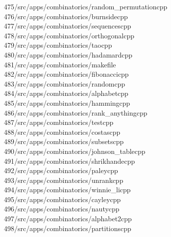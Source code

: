 \begin{tabbing}
475\>/src/apps/combinatorics/random\_permutationcpp\\[0pt]
476\>/src/apps/combinatorics/burnsidecpp\\[0pt]
477\>/src/apps/combinatorics/sequencescpp\\[0pt]
478\>/src/apps/combinatorics/orthogonalcpp\\[0pt]
479\>/src/apps/combinatorics/taocpp\\[0pt]
480\>/src/apps/combinatorics/hadamardcpp\\[0pt]
481\>/src/apps/combinatorics/makefile\\[0pt]
482\>/src/apps/combinatorics/fibonaccicpp\\[0pt]
483\>/src/apps/combinatorics/randomcpp\\[0pt]
484\>/src/apps/combinatorics/alphabetcpp\\[0pt]
485\>/src/apps/combinatorics/hammingcpp\\[0pt]
486\>/src/apps/combinatorics/rank\_anythingcpp\\[0pt]
487\>/src/apps/combinatorics/testcpp\\[0pt]
488\>/src/apps/combinatorics/costascpp\\[0pt]
489\>/src/apps/combinatorics/subsetscpp\\[0pt]
490\>/src/apps/combinatorics/johnson\_tablecpp\\[0pt]
491\>/src/apps/combinatorics/shrikhandecpp\\[0pt]
492\>/src/apps/combinatorics/paleycpp\\[0pt]
493\>/src/apps/combinatorics/unrankcpp\\[0pt]
494\>/src/apps/combinatorics/winnie\_licpp\\[0pt]
495\>/src/apps/combinatorics/cayleycpp\\[0pt]
496\>/src/apps/combinatorics/nautycpp\\[0pt]
497\>/src/apps/combinatorics/alphabet2cpp\\[0pt]
498\>/src/apps/combinatorics/partitionscpp\\[0pt]

\end{tabbing}
